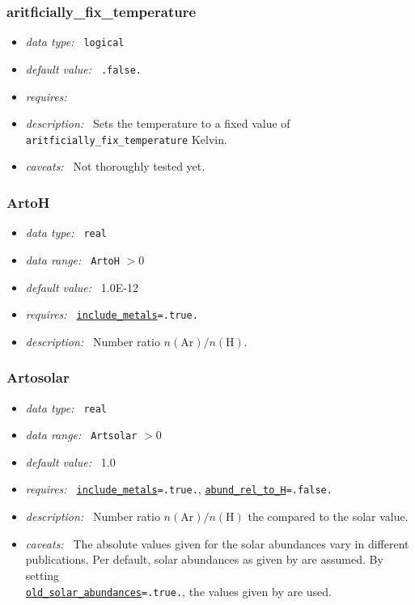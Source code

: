 \documentclass[a4paper,10pt]{article}
\begin{document}
\subsubsection{aritficially\_fix\_temperature}
\label{opt:aritficiallyfixtemperature}
\begin{itemize}
 \item \textit{data type:~} \texttt{logical}
 \item \textit{default value:~} \texttt{.false.}
 \item \textit{requires:~}
 \item \textit{description:~} Sets the temperature to a fixed value of 
 \texttt{aritficially\_fix\_temperature} Kelvin.
 \item \textit{caveats:~} Not thoroughly tested yet.
\end{itemize}


\subsubsection{ArtoH}
\label{opt:artoh}
\begin{itemize}
 \item \textit{data type:~} \texttt{real}
 \item \textit{data range:~}  \texttt{ArtoH} $> 0$
 \item \textit{default value:~} 1.0E-12
 \item \textit{requires:~} \texttt{\hyperref[opt:abundreltoh]{include\_metals}=.true.}
 \item \textit{description:~} Number ratio $n(\mathrm{Ar})/n(\mathrm{H})$.
\end{itemize}


\subsubsection{Artosolar}
\label{opt:artosolar}
\begin{itemize}
 \item \textit{data type:~} \texttt{real}
 \item \textit{data range:~}  \texttt{Artsolar} $> 0$
 \item \textit{default value:~} 1.0
 \item \textit{requires:~} \texttt{\hyperref[opt:includemetals]{include\_metals}=.true.},
 \texttt{\hyperref[opt:abundreltoh]{abund\_rel\_to\_H}=.false.}
 \item \textit{description:~} Number ratio $n(\mathrm{Ar})/n(\mathrm{H})$ the 
  compared to the solar value.
 \item \textit{caveats:~} The absolute values given for the solar abundances  
  vary in different publications. Per default, solar abundances as given 
  by \cite{Asplund2009} are assumed. By setting \\
  \texttt{\hyperref[opt:oldsolarabundances]{old\_solar\_abundances}=.true.}, 
  the values given by \cite{Grevesse1998} are used.
\end{itemize}
\end{document}
